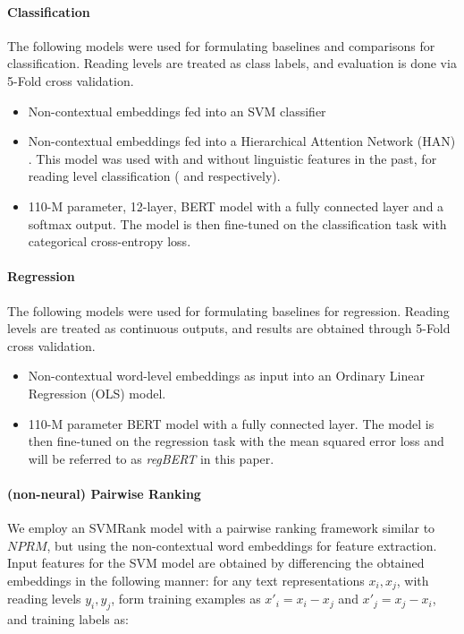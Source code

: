 \documentclass[11pt]{article}
\begin{document}
\paragraph{Classification}
The following models were used for formulating baselines and comparisons for classification. Reading levels are treated as class labels, and evaluation is done via 5-Fold cross validation.  
\begin{itemize}
    \item Non-contextual embeddings fed into an SVM \cite{Boser.Guyon.ea-92} classifier 
    \item Non-contextual embeddings fed into a Hierarchical Attention Network (HAN) \cite{yang2016hierarchical}. This model was used with and without linguistic features in the past, for reading level classification ( and  respectively).  
    \item 110-M parameter, 12-layer, BERT model with a fully connected layer and a softmax output. The model is then fine-tuned on the classification task with categorical cross-entropy loss.
\end{itemize}
 
\paragraph{Regression}
The following models were used for formulating baselines for regression. Reading levels are treated as continuous outputs, and results are obtained through 5-Fold cross validation. 
\begin{itemize}
    \item Non-contextual word-level embeddings as input into an Ordinary Linear Regression (OLS) model. 
    \item 110-M parameter  BERT  model with a fully connected layer.  The model is then fine-tuned on the regression task with the mean squared error loss and will be referred to as \textit{regBERT} in this paper. 
\end{itemize}


\paragraph{(non-neural) Pairwise Ranking}
We employ an SVMRank model with a pairwise ranking framework similar to $NPRM$, but using the non-contextual word embeddings for feature extraction. Input features for the SVM model are obtained by differencing the obtained embeddings in the following manner: for any text representations $x_i, x_j$, with reading levels $y_i, y_j$, form training examples as $x'_i = x_i - x_j$ and $x'_j = x_j - x_i$,  and training labels as: 
\end{document}
